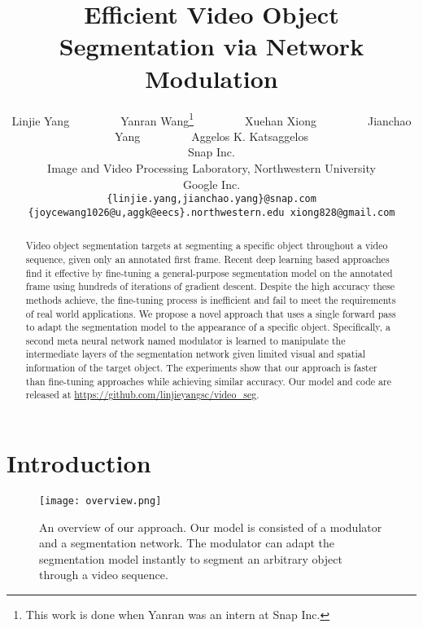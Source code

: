 \documentclass[10pt,twocolumn,letterpaper]{article}
\begin{document}
\title{Efficient Video Object Segmentation via Network Modulation}

\author{Linjie Yang~~~~~~~~~Yanran Wang\thanks{This work is done when Yanran was an intern at Snap Inc.}~~~~~~~~~Xuehan Xiong~~~~~~~~~Jianchao Yang~~~~~~~~~Aggelos K. Katsaggelos\\
Snap Inc.\\
Image and Video Processing Laboratory, Northwestern University\\
Google Inc.\\
{\tt\small \{linjie.yang,jianchao.yang\}@snap.com \{joycewang1026@u,aggk@eecs\}.northwestern.edu xiong828@gmail.com}
}

\maketitle


\begin{abstract}
Video object segmentation targets at segmenting a specific object throughout a video sequence, given only an annotated first frame. Recent deep learning based approaches find it effective by fine-tuning a general-purpose segmentation model on the annotated frame using hundreds of iterations of gradient descent. Despite the high accuracy these methods achieve, the fine-tuning process is inefficient and fail to meet the requirements of real world applications. We propose a novel approach that uses a single forward pass to adapt the segmentation model to the appearance of a specific object. Specifically, a second meta neural network named modulator is learned to manipulate the intermediate layers of the segmentation network given limited visual and spatial information of the target object. The experiments show that our approach is  faster than fine-tuning approaches while achieving similar accuracy. Our model and code are released at \url{https://github.com/linjieyangsc/video_seg}.\vspace{-2pt}
\end{abstract}


\section{Introduction}
\begin{figure}[t]\centering
\texttt{[image: overview.png]}
\caption{An overview of our approach. Our model is consisted of a modulator and a segmentation network. The modulator can adapt the segmentation model instantly to segment an arbitrary object through a video sequence.}
\label{fig:overview}\vspace{-2pt}
\end{figure}
\end{document}
